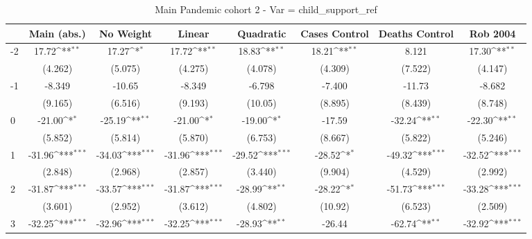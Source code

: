 \documentclass{article}
\begin{document}
{
\def\sym#1{\ifmmode^{#1}\else\(^{#1}\)\fi}
\begin{longtable}{l*{7}{c}}
\caption{Main Pandemic cohort 2 - Var = child\_support\_ref}\\
\hline\hline\endfirsthead\hline\endhead\hline\endfoot\endlastfoot
                &\multicolumn{1}{c}{Main (abs.)}&\multicolumn{1}{c}{No Weight}&\multicolumn{1}{c}{Linear}&\multicolumn{1}{c}{Quadratic}&\multicolumn{1}{c}{Cases Control}&\multicolumn{1}{c}{Deaths Control}&\multicolumn{1}{c}{Rob 2004}\\
\hline
-2              &    17.72\sym{**} &    17.27\sym{*}  &    17.72\sym{**} &    18.83\sym{**} &    18.21\sym{**} &    8.121         &    17.30\sym{**} \\
                &  (4.262)         &  (5.075)         &  (4.275)         &  (4.078)         &  (4.309)         &  (7.522)         &  (4.147)         \\
-1              &   -8.349         &   -10.65         &   -8.349         &   -6.798         &   -7.400         &   -11.73         &   -8.682         \\
                &  (9.165)         &  (6.516)         &  (9.193)         &  (10.05)         &  (8.895)         &  (8.439)         &  (8.748)         \\
0               &   -21.00\sym{*}  &   -25.19\sym{**} &   -21.00\sym{*}  &   -19.00\sym{*}  &   -17.59         &   -32.24\sym{**} &   -22.30\sym{**} \\
                &  (5.852)         &  (5.814)         &  (5.870)         &  (6.753)         &  (8.667)         &  (5.822)         &  (5.246)         \\
1               &   -31.96\sym{***}&   -34.03\sym{***}&   -31.96\sym{***}&   -29.52\sym{***}&   -28.52\sym{*}  &   -49.32\sym{***}&   -32.52\sym{***}\\
                &  (2.848)         &  (2.968)         &  (2.857)         &  (3.440)         &  (9.904)         &  (4.529)         &  (2.992)         \\
2               &   -31.87\sym{***}&   -33.57\sym{***}&   -31.87\sym{***}&   -28.99\sym{**} &   -28.22\sym{*}  &   -51.73\sym{***}&   -33.28\sym{***}\\
                &  (3.601)         &  (2.952)         &  (3.612)         &  (4.802)         &  (10.92)         &  (6.523)         &  (2.509)         \\
3               &   -32.25\sym{***}&   -32.96\sym{***}&   -32.25\sym{***}&   -28.93\sym{**} &   -26.44         &   -62.74\sym{**} &   -32.92\sym{***}\\

\end{longtable}}
\end{document}
